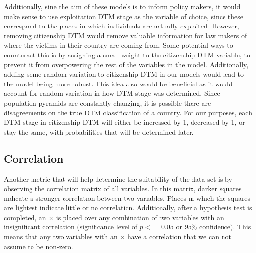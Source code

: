 \documentclass{article} %
\begin{document}
Additionally, sine the aim of these models is to inform policy makers, it would make sense to use exploitation DTM stage as the variable of choice, since these correspond to the places in which individuals are actually exploited. However, removing citizenship DTM would remove valuable information for law makers of where the victims in their country are coming from. 
Some potential ways to counteract this is by assigning a small weight to the citizenship DTM variable, to prevent it from overpowering the rest of the variables in the model. Additionally, adding some random variation to citizenship DTM in our models would lead to the model being more robust. This idea also would be beneficial as it would account for random variation in how DTM stage was determined. Since population pyramids are constantly changing, it is possible there are disagreements on the true DTM classification of a country. For our purposes, each DTM stage in citizenship DTM will either be increased by 1, decreased by 1, or stay the same, with probabilities that will be determined later.

\subsection{Correlation}

Another metric that will help determine the suitability of the data set is by observing the correlation matrix of all variables. In this matrix, darker squares indicate a stronger correlation between two variables. Places in which the squares are lightest indicate little or no correlation. Additionally, after a hypothesis test is completed, an $\times$ is placed over any combination of two variables with an insignificant correlation (significance level of $p <= 0.05$ or 95\% confidence). This means that any two variables with an $\times$ have a correlation that we can not assume to be non-zero.
\end{document}

